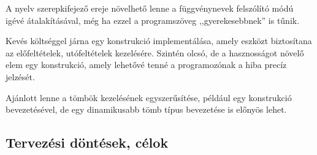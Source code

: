 A nyelv szerepkifejező ereje növelhető lenne a függvénynevek felszólító módú igévé átalakításával, még ha ezzel a programszöveg ,,gyerekesebbnek'' is tűnik.

Kevés költséggel járna egy  konstrukció implementálása, amely eszközt biztosítana az előfeltételek, utófeltételek kezelésére.
Szintén olcsó, de a hasznosságot növelő elem egy  konstrukció, amely lehetővé tenné a programozónak a hiba precíz jelzését.

Ajánlott lenne a tömbök kezelésének egyszerűsítése, például egy  konstrukció bevezetésével, de egy dinamikusabb tömb típus bevezetése is előnyös lehet.


\subsection{Tervezési döntések, célok}\label{subsec:plans}




%
